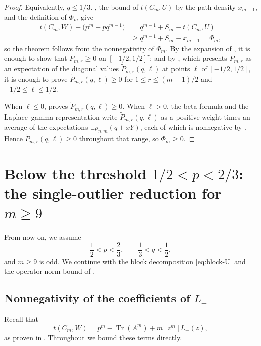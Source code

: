 ﻿\documentclass[11pt]{article}
\numberwithin{equation}{section}
\newcommand{\Tr}{\operatorname{Tr}}
\newcommand{\E}{\mathbb E}
\begin{document}
\begin{proof}
  Equivalently, $q\le1/3$.
  , the bound of $t(C_m,U)$ by the path density $x_{m-1}$, and the definition of $\Phi_m$ give
  \begin{align*}
    t(C_m,W)-\bigl(p^m-pq^{m-1}\bigr)
    &=q^{m-1}+S_m-t(C_m,U)\\
    &\ge q^{m-1}+S_m-x_{m-1}=\Phi_m,
  \end{align*}
  so the theorem follows from the nonnegativity of $\Phi_m$.
  By the expansion of , it is enough to show that $P_{m,r}\ge0$ on $[-1/2,1/2]^r$; and by , which presents $P_{m,r}$ as an expectation of the diagonal values $\widetilde P_{m,r}(q,\ell)$ at points $\ell$ of $[-1/2,1/2]$, it is enough to prove $\widetilde P_{m,r}(q,\ell)\ge0$ for $1\le r\le(m-1)/2$ and $-1/2\le\ell\le1/2$.

  When $\ell\le0$,  proves $\widetilde P_{m,r}(q,\ell)\ge0$.
  When $\ell>0$, the beta formula  and the Laplace--gamma representation  write $\widetilde P_{m,r}(q,\ell)$ as a positive weight times an average of the expectations $\E\rho_{n,m}(q+xY)$, each of which is nonnegative by .
  Hence $\widetilde P_{m,r}(q,\ell)\ge0$ throughout that range, so $\Phi_m\ge0$.
\end{proof}

\section{Below the threshold \texorpdfstring{$1/2<p<2/3$}{1/2<p<2/3}: the single-outlier reduction for \texorpdfstring{$m\ge9$}{m>=9}}
\label{sec:plt23}

From now on, we assume
\begin{equation}\label{eq:plt23-range}
  \frac{1}{2}<p<\frac{2}{3}, \qquad \frac{1}{3}<q<\frac{1}{2},
\end{equation}
and $m\ge9$ is odd.
We continue with the block decomposition \eqref{eq:block-U} and the operator norm bound of .

\subsection{Nonnegativity of the coefficients of \texorpdfstring{$L_-$}{L-}}\label{subsec:plt23-one-sided-schur}

Recall that
\begin{equation}\label{eq:plt23-one-sided-identity}
  t(C_m,W)=p^m-\Tr(A^m)+m[z^m]L_-(z),
\end{equation}
as proven in .
Throughout  we bound these terms directly.
\end{document}
